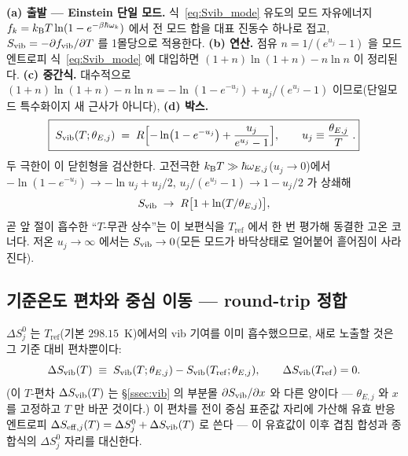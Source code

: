 \textbf{(a) 출발 --- Einstein 단일 모드.} 식~\eqref{eq:Svib_mode} 유도의 모드 자유에너지
$f_k=k_{\mathrm B} T\ln(1-e^{-\beta\hbar\omega_k})$ 에서 전 모드 합을 대표 진동수 하나로 접고, $S_{\mathrm{vib}}=-\partial
f_{\mathrm{vib}}/\partial T$ 를 1몰당으로 적용한다. \textbf{(b) 연산.} 점유 $n=1/(e^{u_j}-1)$ 을 모드 엔트로피
식~\eqref{eq:Svib_mode} 에 대입하면 $(1+n)\ln(1+n)-n\ln n$ 이 정리된다. \textbf{(c) 중간식.} 대수적으로
$(1+n)\ln(1+n)-n\ln n=-\ln(1-e^{-u_j})+u_j/(e^{u_j}-1)$ 이므로(단일모드 특수화이지 새 근사가 아니다),
\textbf{(d) 박스.}
\begin{equation}
\boxed{\;S_{\mathrm{vib}}(T;\theta_{E,j}) \;=\; R\Bigl[-\ln\bigl(1-e^{-u_j}\bigr)+\frac{u_j}{e^{u_j}-1}\Bigr],
\qquad u_j\equiv\frac{\theta_{E,j}}{T}\;.}
\label{eq:Svib-einstein}
\end{equation}
두 극한이 이 닫힌형을 검산한다. 고전극한 $k_{\mathrm B} T\gg\hbar\omega_{E,j}$($u_j\to0$)에서
$-\ln(1-e^{-u_j})\to-\ln u_j+u_j/2$, $u_j/(e^{u_j}-1)\to1-u_j/2$ 가 상쇄해
\[
S_{\mathrm{vib}}\;\to\;R\bigl[1+\ln(T/\theta_{E,j})\bigr],
\]
곧 앞 절이 흡수한 ``$T$-무관 상수''는 이 보편식을 $T_\mathrm{ref}$ 에서 한 번 평가해 동결한 고온 코너다.
저온 $u_j\to\infty$ 에서는 $S_{\mathrm{vib}}\to0$(모든 모드가 바닥상태로 얼어붙어 흩어짐이 사라진다).

\subsection{기준온도 편차와 중심 이동 --- round-trip 정합}\label{ssec:einstein-roundtrip}
$\Delta S^0_j$ 는 $T_\mathrm{ref}$(기본 $298.15$~K)에서의 vib 기여를 이미 흡수했으므로, 새로 노출할 것은 그
기준 대비 편차뿐이다:
\begin{equation}
\Delta S_{\mathrm{vib}}(T) \;\equiv\; S_{\mathrm{vib}}(T;\theta_{E,j})-S_{\mathrm{vib}}(T_\mathrm{ref};\theta_{E,j}),
\qquad \Delta S_{\mathrm{vib}}(T_\mathrm{ref})=0.
\label{eq:dSvib}
\end{equation}
(이 $T$-편차 $\Delta S_{\mathrm{vib}}(T)$ 는 \S\ref{ssec:vib} 의 부분몰 $\partial S_{\mathrm{vib}}/\partial x$ 와 다른 양이다 ---
$\theta_{E,j}$ 와 $x$ 를 고정하고 $T$ 만 바꾼 것이다.) 이 편차를 전이 중심 표준값 자리에 가산해 유효 반응
엔트로피 $\Delta S_{\mathrm{eff},j}(T)=\Delta S^0_j+\Delta S_{\mathrm{vib}}(T)$ 로 쓴다 --- 이 유효값이 이후 겹침 합성과
종합식의 $\Delta S^0_j$ 자리를 대신한다.

